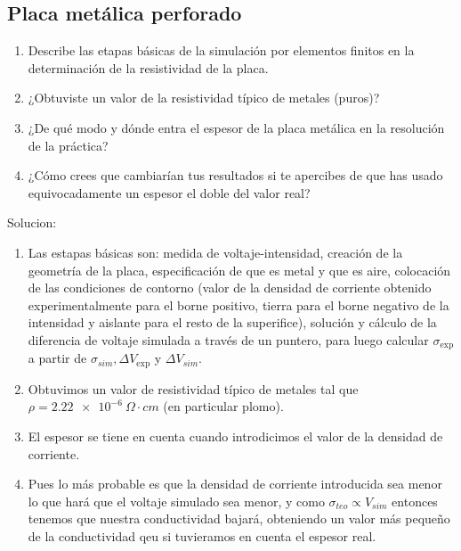 \begin{Enunciado}
	\subsection*{Placa metálica perforado}

	\begin{enumerate}[label=\alph*)]
		\item Describe las etapas básicas de la simulación por elementos finitos en la determinación de la resistividad de la placa.
		\item ¿Obtuviste un valor de la resistividad típico de metales (puros)?
		\item ¿De qué modo y dónde entra el espesor de la placa metálica en la resolución de la práctica?
		\item ¿Cómo crees que cambiarían tus resultados si te apercibes de que has usado equivocadamente un espesor el doble del valor real?
		\end{enumerate}

\end{Enunciado}
Solucion:
\begin{enumerate}[label=\alph*)]
	\item Las estapas básicas son: medida de voltaje-intensidad, creación de la geometría de la placa, especificación de que es metal y que es aire, colocación de las condiciones de contorno (valor de la densidad de corriente obtenido experimentalmente para el borne positivo, tierra para el borne negativo de la intensidad y aislante para el resto de la superifice), solución y cálculo de la diferencia de voltaje simulada a través de un puntero, para luego calcular $\sigma_{\exp}$ a partir de $\sigma_{sim}, \Delta V_{\exp}$ y $\Delta V_{sim}$. 
	\item Obtuvimos un valor de resistividad típico de metales tal que $\rho=\SI{2.22e-6}{\Omega \cdot cm}$ (en particular plomo).
	\item El espesor se tiene en cuenta cuando introdicimos el valor de la densidad de corriente. 
	\item Pues lo más probable es que la densidad de corriente introducida sea menor lo que hará que el voltaje simulado sea menor, y como $\sigma_{teo} \propto V_{sim}$ entonces tenemos que nuestra conductividad bajará, obteniendo un valor más pequeño de la conductividad qeu si tuvieramos en cuenta el espesor real. 
	
\end{enumerate}

\vspace*{2em}

